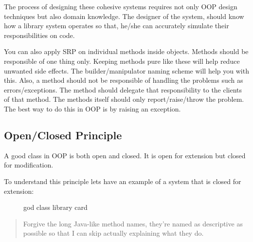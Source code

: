 The process of designing these cohesive systems requires not only OOP
design techniques but also domain knowledge. The designer of the system,
should know how a library system operates so that, he/she can accurately
simulate their responsibilities on code.

You can also apply SRP on individual methods inside objects. Methods
should be responsible of one thing only. Keeping methods pure like these
will help reduce unwanted side effects. The builder/manipulator naming
scheme will help you with this. Also, a method should not be responsible
of handling the problems such as errors/exceptions. The method should
delegate that responsibility to the clients of that method. The methods
itself should only report/raise/throw the problem. The best way to do
this in OOP is by raising an exception.

\subsection{Open/Closed
Principle}\label{solid-objects.md__openclosed-principle}

A good class in OOP is both open and closed. It is open for extension
but closed for modification.

To understand this principle lets have an example of a system that is
closed for extension:

\begin{figure}
\centering
{}
\caption{god class library card}
\end{figure}

\begin{quote}
Forgive the long Java-like method names, they're named as descriptive as
possible so that I can skip actually explaining what they do.
\end{quote}

